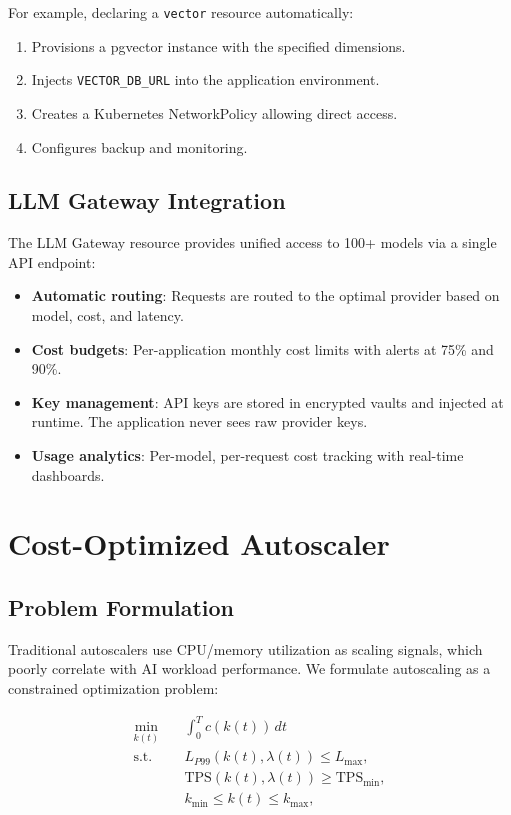 \documentclass[11pt,twocolumn]{article}
\begin{document}
For example, declaring a \texttt{vector} resource automatically:
\begin{enumerate}[leftmargin=1.4em]
    \item Provisions a pgvector instance with the specified dimensions.
    \item Injects \texttt{VECTOR\_DB\_URL} into the application environment.
    \item Creates a Kubernetes NetworkPolicy allowing direct access.
    \item Configures backup and monitoring.
\end{enumerate}

\subsection{LLM Gateway Integration}

The LLM Gateway resource provides unified access to 100+ models via a single API endpoint:

\begin{itemize}[leftmargin=1.1em]
    \item \textbf{Automatic routing}: Requests are routed to the optimal provider based on model, cost, and latency.
    \item \textbf{Cost budgets}: Per-application monthly cost limits with alerts at 75\% and 90\%.
    \item \textbf{Key management}: API keys are stored in encrypted vaults and injected at runtime. The application never sees raw provider keys.
    \item \textbf{Usage analytics}: Per-model, per-request cost tracking with real-time dashboards.
\end{itemize}

\section{Cost-Optimized Autoscaler}
\label{sec:autoscaler}

\subsection{Problem Formulation}

Traditional autoscalers use CPU/memory utilization as scaling signals, which poorly correlate with AI workload performance. We formulate autoscaling as a constrained optimization problem:

\begin{align}
\min_{k(t)} \quad & \int_0^T c(k(t)) \, dt \label{eq:autoscale} \\
\text{s.t.} \quad & L_{P99}(k(t), \lambda(t)) \le L_{\max}, \nonumber \\
& \text{TPS}(k(t), \lambda(t)) \ge \text{TPS}_{\min}, \nonumber \\
& k_{\min} \le k(t) \le k_{\max}, \nonumber
\end{align}
\end{document}
